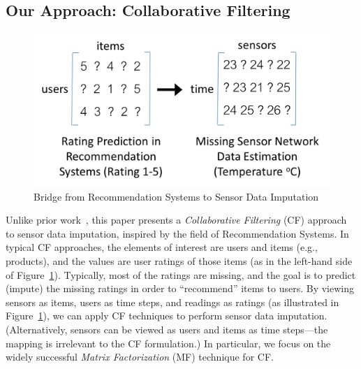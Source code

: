 

\subsection{Our Approach: Collaborative Filtering}

\vspace{-0.5cm}

\begin{figure}[h]
\centering

\includegraphics[scale=0.35,trim=4 4 4 4,clip]{recommend_imputation_timerow_white.png}
\vspace{-0.1in}
\caption{Bridge from Recommendation Systems to Sensor Data Imputation} 
\label{recommend_imputation}
\vspace{-0.1in}
\end{figure}

Unlike prior work~\cite{Granger:lastseen, le2005estimating, 
Gruenwald:FARM, li2008data, yuan2000multiple, Jian-Zhong:STI, pan2010k,
osborne2012real, beckers2003eof, kondrashov2006spatio}, this paper presents a {\em Collaborative Filtering} (CF) 
approach to sensor data imputation, inspired by the field of Recommendation
Systems.  In typical CF approaches, the elements of interest are users
and items (e.g., products), and the values are user ratings of those
items (as in the left-hand side of
Figure~\ref{recommend_imputation}).  Typically, most of the ratings
are missing, and the goal is to predict (impute) the missing ratings
in order to ``recommend'' items to users.  By viewing sensors as
items, users as time steps, and readings as ratings (as illustrated in
Figure~\ref{recommend_imputation}), we can apply CF
techniques to perform sensor data imputation. (Alternatively, sensors
can be viewed as users and items as time steps---the mapping is
irrelevant to the CF formulation.)  In particular, we focus on the
widely successful {\em Matrix Factorization} (MF) technique for CF.

